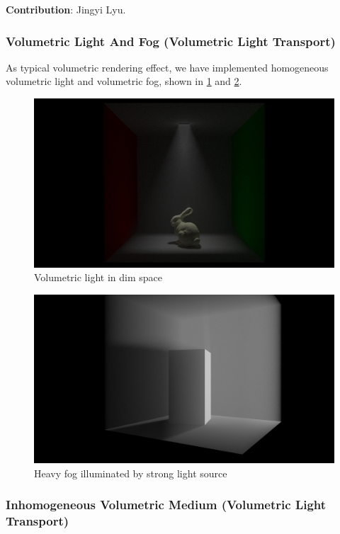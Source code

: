 \documentclass[acmtog]{acmart}
\begin{document}
\noindent \textbf{Contribution}: Jingyi Lyu.

\subsubsection{Volumetric Light And Fog (Volumetric Light Transport)}

As typical volumetric rendering effect, we have implemented homogeneous volumetric light and volumetric fog, shown in \ref{vol_light} and \ref{heavy_fog}.

\begin{figure}[h]
	\centering	
	\includegraphics[width=\linewidth]{vol_light}
	\caption{Volumetric light in dim space}
	\label{vol_light}
\end{figure}

\begin{figure}[h]
	\centering	
	\includegraphics[width=\linewidth]{heavy_fog}
	\caption{Heavy fog illuminated by strong light source}
	\label{heavy_fog}
\end{figure}

\subsubsection{Inhomogeneous Volumetric Medium (Volumetric Light Transport)}
\end{document}
